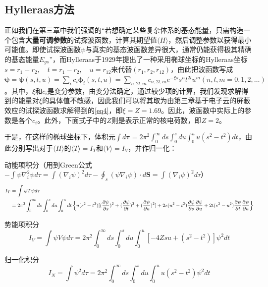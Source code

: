 \subsection{Hylleraas方法}
正如我们在第三章中我们强调的“若想确定某些复杂体系的基态能量，只需构造一个包含\textbf{大量可调参数}的试探波函数，计算其期望值$\langle H \rangle$，然后调整参数以获得最小可能值。即使试探波函数$\psi$与真实的基态波函数差异很大，通常仍能获得极其精确的基态能量$E_{gs}$”，而Hylleraas于1929年提出了一种采用椭球坐标的Hylleraas坐标$s=r_1+r_2, \quad t=r_1-r_2, \quad u=r_{12} $来代替$(r_1,r_2,r_{12})$，由此把波函数写成$\mathbf{\psi }=\mathbf{\psi } (s,t,u)=\sum_{i}c_i \mathbf{\phi}_i(s,t,u)=\sum_{n,2l,m} c_{n,2l,m} e^{- \xi s}s^{n} t^{2l} u^{m}(n,l,m=0,1,2,…)$。其中，$\xi$和$c_i$是变分参数，由变分法确定，通过较少项的计算，我们发现求解得到的能量对$\xi$的具体值不敏感，因此我们可以将其取为由第三章基于电子云的屏蔽效应的试探波函数求解得到的\cref{eq4}，即$\xi=Z=1.69$。因此，波函数中实际上的参数是各个$c_i$。此外，下面式子中的$Z$则是表示正常的核电荷数，即$Z=2$。

于是，在这样的椭球坐标下，体积元$\int d \mathbf{\tau}=2 \pi^2 \int_{0}^{ \infty} ds \int_{0}^{ s} du \int_{0}^{ u} u(s^2 -t^2) dt$，由此分别写出对于$\langle H \rangle$的$\langle T \rangle=I_T$和$\langle V \rangle=I_V$，并作归一化：

动能项积分（用到Green公式$-\int \psi \nabla ^2_i \psi d \tau =\int ( \nabla_i \psi)^2 d \tau -\oint_{s} (\psi \nabla_i \psi)\cdot  d \mathbf{S}= \int ( \nabla_i \psi)^2 d \tau$）
\begin{equation}\label{eq5}\small
	\begin{split}
		I_T&= \int \psi T \psi d \tau\\
		&= 2 \pi^2 \int_{0}^{\infty} ds \int _{0}^{s} du \int_{0}^{u}dt  \left \{ u(s^2- t^2) [(\frac{\partial \psi}{\partial s} )^2 +(\frac{\partial \psi}{\partial t} )^2+(\frac{\partial \psi}{\partial u} )^2 ] +2s(u^2 -t^2) \frac{\partial \psi}{\partial s} \frac{\partial \psi}{\partial u} +2t(s^2 -u^2) \frac{\partial \psi}{\partial t} \frac{\partial \psi}{\partial u}  \right \} 
	\end{split}
\end{equation}

势能项积分
\begin{equation}\label{eq6}
	I_V=\int \psi V \psi d \tau=2 \pi^2 \int_{0}^{ \infty} ds \int_{0}^{s} du \int_{0}^{u}[ -4Z su +(s^2 -t^2)] \psi^2 dt		
\end{equation}

归一化积分
\begin{equation}\label{eq7}
	I_N= \int  \psi^2 d \tau= 2 \pi^2 \int_{0}^{\infty} ds \int_{0}^{s} du \int_{0}^{u} u(s^2 -t^2) \psi^2 dt 		
\end{equation}

